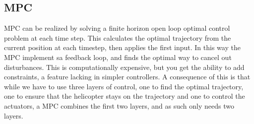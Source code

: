 
\subsection{MPC}
MPC can be realized by solving a finite horizon open loop optimal control problem at each time step. This calculates the optimal trajectory from the current position at each timestep, then applies the first input. In this way the MPC implement sa feedback loop, and finds the optimal way to cancel out disturbances. This is computationally expensive, but you get the ability to add constraints, a feature lacking in simpler controllers. A consequence of this is that while we have to use three layers of control, one to find the optimal trajectory, one to ensure that the helicopter stays on the trajectory and one to control the actuators, a MPC combines the first two layers, and as such only needs two layers.

%
%
